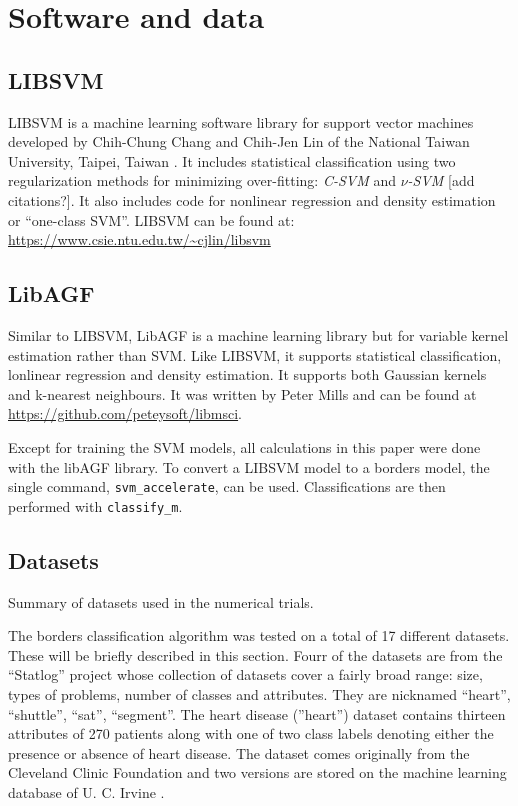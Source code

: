 \documentclass[11pt]{article}
\begin{document}
\section{Software and data}

\subsection{LIBSVM}

LIBSVM is a machine learning software library for support vector machines 
developed by Chih-Chung Chang and Chih-Jen Lin of 
the National Taiwan University, Taipei, Taiwan \citep{Chang_Lin2011}.
It includes statistical classification using two regularization methods 
for minimizing over-fitting: 
{\it C-SVM} and {\it $\nu$-SVM} [add citations?].
It also includes code for nonlinear regression and density estimation or
``one-class SVM''.
LIBSVM can be found at: \url{https://www.csie.ntu.edu.tw/~cjlin/libsvm}

\subsection{LibAGF}

Similar to LIBSVM, LibAGF is a machine learning library but for variable kernel 
estimation \citep{Mills2011,Terrell_Scott1992} rather than SVM.
Like LIBSVM, it supports statistical classification, lonlinear regression
and density estimation.
It supports both Gaussian kernels and k-nearest neighbours.
It was written by Peter Mills and can be found at
\url{https://github.com/peteysoft/libmsci}.

Except for training the SVM models, all calculations in this paper were done 
with the libAGF library. To convert a LIBSVM model to a borders model,
the single command, \verb/svm_accelerate/, can be used.
Classifications are then performed with \verb/classify_m/.

\subsection{Datasets}

\label{datasets}

\begin{table}
	\caption{Summary of datasets used in the numerical trials.}
	\label{summary}
	
\end{table}

The borders classification algorithm was tested on a total of 
17 different datasets.
These will be briefly described in this section.
Fourr of the datasets are from
the ``Statlog'' project \citep{Michie_etal1994,King_etal1995} whose collection of datasets 
cover a fairly broad range: size, types of problems, number of classes and attributes.
They are nicknamed ``heart'', ``shuttle'', ``sat'', ``segment''.
The heart disease (''heart'') dataset 
contains thirteen attributes of 270 patients along with one of two class labels denoting either the presence or absence of heart disease.
The dataset comes originally from the Cleveland Clinic Foundation and two versions are stored on the machine learning database of U. C. Irvine \citep{Lichman2013}.
\end{document}
